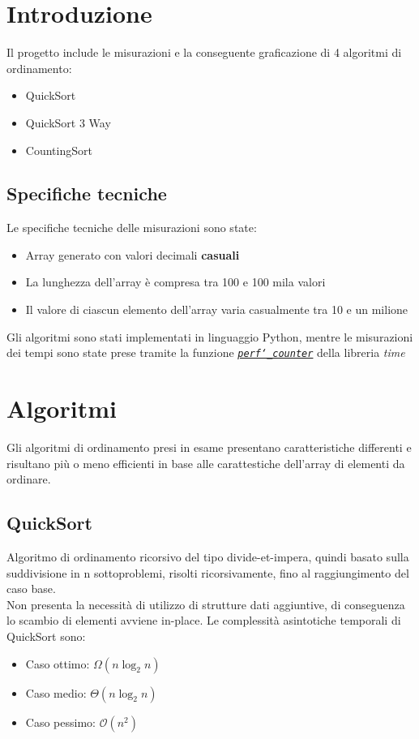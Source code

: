 \documentclass[a4paper, 11pt]{article}
\newcommand{\myfrontpage}{%
  \begin{titlepage}
  \centering
  \preparefrontpage
  \end{titlepage}
  \global\let\centering\relax %
}
\begin{document}
\myfrontpage

\thispagestyle{empty} 

\newpage

\tableofcontents
\newpage
\section{Introduzione}
Il progetto include le misurazioni e la conseguente graficazione di 4 algoritmi di ordinamento:
\begin{itemize}
    \item QuickSort
    \item QuickSort 3 Way
    \item CountingSort
\end{itemize}
\subsection{Specifiche tecniche}
Le specifiche tecniche delle misurazioni sono state:
\begin{itemize}
    \item Array generato con valori decimali \textbf{casuali}
    \item La lunghezza dell'array è compresa tra 100 e 100 mila valori
    \item Il valore di ciascun elemento dell'array varia casualmente tra 10 e un milione
\end{itemize}
Gli algoritmi sono stati implementati in linguaggio Python, mentre le misurazioni dei tempi sono state prese tramite la funzione \href{https://docs.python.org/3/library/time.html#time.perf_counter}{\textit{\texttt{perf\char`_counter}}} della libreria \textit{time}

\section{Algoritmi}
Gli algoritmi di ordinamento presi in esame presentano caratteristiche differenti e risultano più o meno efficienti in base alle carattestiche dell'array di elementi da ordinare.

\subsection{QuickSort}
Algoritmo di ordinamento ricorsivo del tipo divide-et-impera, quindi basato sulla suddivisione in n sottoproblemi, risolti ricorsivamente, fino al raggiungimento del caso base.\\
Non presenta la necessità di utilizzo di strutture dati aggiuntive, di conseguenza lo scambio di elementi avviene in-place.\bigbreak
Le complessità asintotiche temporali di QuickSort sono:
\begin{itemize}
    \item Caso ottimo: $\Omega(n\log_2n)$
    \item Caso medio: $\Theta(n\log_2n)$
    \item Caso pessimo: $\mathcal{O}(n^2)$
\end{itemize}
\end{document}
